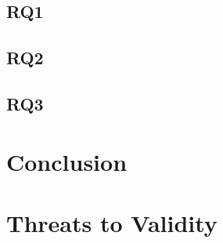 \documentclass[sigconf]{acmart}
\begin{document}
\subsection{RQ1}
\subsection{RQ2}
\subsection{RQ3}


\section{Conclusion}

\section{Threats to Validity}
\balance



\end{document}
